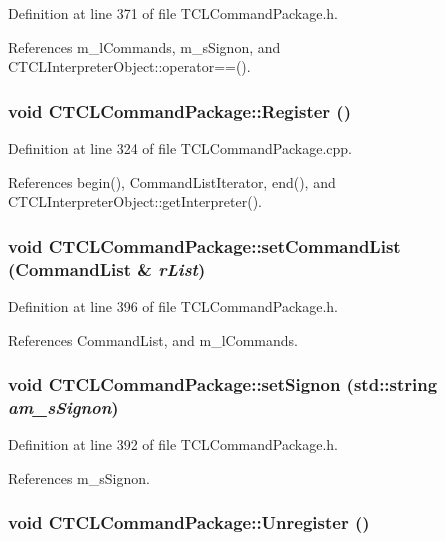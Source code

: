 Definition at line 371 of file TCLCommand\-Package.h.

References m\_\-l\-Commands, m\_\-s\-Signon, and CTCLInterpreter\-Object::operator==().
\subsubsection{\setlength{\rightskip}{0pt plus 5cm}void CTCLCommand\-Package::Register ()}\label{classCTCLCommandPackage_a8}




Definition at line 324 of file TCLCommand\-Package.cpp.

References begin(), Command\-List\-Iterator, end(), and CTCLInterpreter\-Object::get\-Interpreter().
\subsubsection{\setlength{\rightskip}{0pt plus 5cm}void CTCLCommand\-Package::set\-Command\-List ({\bf Command\-List} \& {\em r\-List})\hspace{0.3cm}{\tt  [inline, protected]}}\label{classCTCLCommandPackage_b1}




Definition at line 396 of file TCLCommand\-Package.h.

References Command\-List, and m\_\-l\-Commands.
\subsubsection{\setlength{\rightskip}{0pt plus 5cm}void CTCLCommand\-Package::set\-Signon (std::string {\em am\_\-s\-Signon})\hspace{0.3cm}{\tt  [inline, protected]}}\label{classCTCLCommandPackage_b0}




Definition at line 392 of file TCLCommand\-Package.h.

References m\_\-s\-Signon.
\subsubsection{\setlength{\rightskip}{0pt plus 5cm}void CTCLCommand\-Package::Unregister ()}\label{classCTCLCommandPackage_a9}




